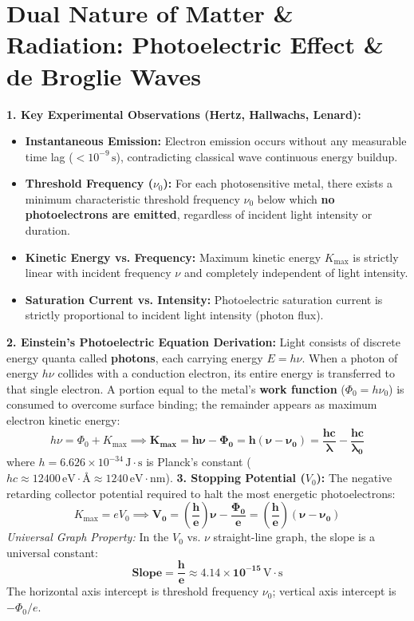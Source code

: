 \documentclass[10pt,a4paper]{article}
\begin{document}
\section{Dual Nature of Matter \& Radiation: Photoelectric Effect \& de Broglie Waves}

\begin{conceptbox}
\textbf{1. Key Experimental Observations (Hertz, Hallwachs, Lenard):}
\begin{itemize}
  \item \textbf{Instantaneous Emission:} Electron emission occurs without any measurable time lag ($< 10^{-9}\,\mathrm{s}$), contradicting classical wave continuous energy buildup.
  \item \textbf{Threshold Frequency ($\nu_0$):} For each photosensitive metal, there exists a minimum characteristic threshold frequency $\nu_0$ below which \textbf{no photoelectrons are emitted}, regardless of incident light intensity or duration.
  \item \textbf{Kinetic Energy vs. Frequency:} Maximum kinetic energy $K_{\max}$ is strictly linear with incident frequency $\nu$ and completely independent of light intensity.
  \item \textbf{Saturation Current vs. Intensity:} Photoelectric saturation current is strictly proportional to incident light intensity (photon flux).
\end{itemize}
\textbf{2. Einstein's Photoelectric Equation Derivation:}
Light consists of discrete energy quanta called \textbf{photons}, each carrying energy $E = h\nu$.
When a photon of energy $h\nu$ collides with a conduction electron, its entire energy is transferred to that single electron. A portion equal to the metal's \textbf{work function} ($\Phi_0 = h\nu_0$) is consumed to overcome surface binding; the remainder appears as maximum electron kinetic energy:
\begin{equation}
  h\nu = \Phi_0 + K_{\max} \implies \mathbf{K_{\max} = h\nu - \Phi_0 = h(\nu - \nu_0) = \frac{hc}{\lambda} - \frac{hc}{\lambda_0}}
\end{equation}
where $h = 6.626 \times 10^{-34}\,\mathrm{J}\cdot\mathrm{s}$ is Planck's constant ($hc \approx 12400\,\mathrm{eV}\cdot\text{\AA} \approx 1240\,\mathrm{eV}\cdot\mathrm{nm}$).
\textbf{3. Stopping Potential ($V_0$):}
The negative retarding collector potential required to halt the most energetic photoelectrons:
\begin{equation}
  K_{\max} = e V_0 \implies \mathbf{V_0 = \left(\frac{h}{e}\right)\nu - \frac{\Phi_0}{e} = \left(\frac{h}{e}\right)(\nu - \nu_0)}
\end{equation}
\textit{Universal Graph Property:} In the $V_0$ vs. $\nu$ straight-line graph, the slope is a universal constant:
\begin{equation}
  \mathbf{\text{Slope} = \frac{h}{e} \approx 4.14 \times 10^{-15}\,\mathrm{V}\cdot\mathrm{s}}
\end{equation}
The horizontal axis intercept is threshold frequency $\nu_0$; vertical axis intercept is $-\Phi_0/e$.
\end{conceptbox}
\end{document}

